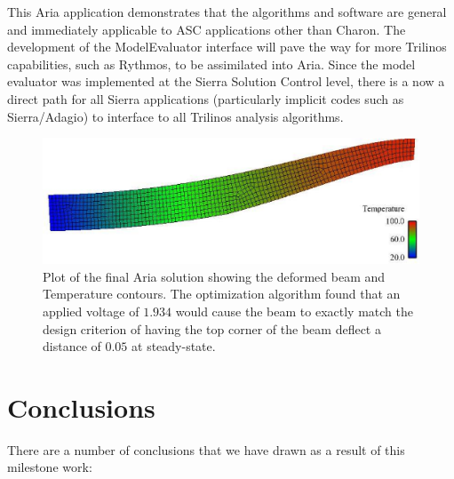 \documentclass[pdf,ps2pdf,11pt]{SANDreport}
\begin{document}
This Aria application demonstrates that the algorithms and software are
general and immediately applicable to ASC applications other than Charon. The
development of the ModelEvaluator interface will pave the way for more
Trilinos capabilities, such as Rythmos, to be assimilated into Aria. Since the
model evaluator was implemented at the Sierra Solution Control level, there is
a now a direct path for all Sierra applications (particularly implicit codes
such as Sierra/Adagio) to interface to all Trilinos analysis algorithms.
{\bsinglespace
\begin{figure}
\begin{center}
\includegraphics*[angle=0,scale=0.50
]{SiC_dY0.1.eps}
\end{center}
\caption{
\label{fig:ariaFinal}
Plot of the final Aria solution showing the deformed beam and Temperature
contours. The optimization algorithm found that an applied voltage of $1.934$
would cause the beam to exactly match the design criterion of having the top
corner of the beam deflect a distance of $0.05$ at steady-state.  }
\end{figure}
\esinglespace}

%
\section{Conclusions}
%

There are a number of conclusions that we have drawn as a result of this
milestone work:
\end{document}
